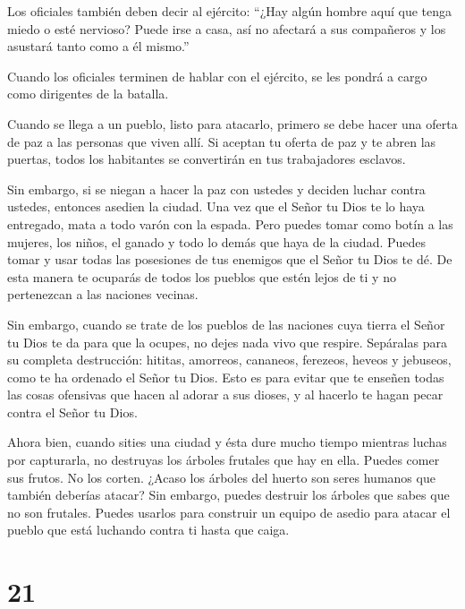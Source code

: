 Los oficiales también deben decir al ejército: ``¿Hay algún
hombre aquí que tenga miedo o esté nervioso? Puede irse a casa, así no
afectará a sus compañeros y los asustará tanto como a él mismo.''

 Cuando los oficiales terminen de hablar con el ejército, se
les pondrá a cargo como dirigentes de la batalla.

 Cuando se llega a un pueblo, listo para atacarlo, primero
se debe hacer una oferta de paz a las personas que viven allí.
 Si aceptan tu oferta de paz y te abren las puertas, todos
los habitantes se convertirán en tus trabajadores esclavos.

 Sin embargo, si se niegan a hacer la paz con ustedes y
deciden luchar contra ustedes, entonces asedien la ciudad. 
Una vez que el Señor tu Dios te lo haya entregado, mata a todo varón con
la espada.  Pero puedes tomar como botín a las mujeres, los
niños, el ganado y todo lo demás que haya de la ciudad. Puedes tomar y
usar todas las posesiones de tus enemigos que el Señor tu Dios te dé.
 De esta manera te ocuparás de todos los pueblos que estén
lejos de ti y no pertenezcan a las naciones vecinas.

 Sin embargo, cuando se trate de los pueblos de las
naciones cuya tierra el Señor tu Dios te da para que la ocupes, no dejes
nada vivo que respire.  Sepáralas para su completa
destrucción: hititas, amorreos, cananeos, ferezeos, heveos y jebuseos,
como te ha ordenado el Señor tu Dios.  Esto es para evitar
que te enseñen todas las cosas ofensivas que hacen al adorar a sus
dioses, y al hacerlo te hagan pecar contra el Señor tu Dios.

 Ahora bien, cuando sities una ciudad y ésta dure mucho
tiempo mientras luchas por capturarla, no destruyas los árboles frutales
que hay en ella. Puedes comer sus frutos. No los corten. ¿Acaso los
árboles del huerto son seres humanos que también deberías atacar?
 Sin embargo, puedes destruir los árboles que sabes que no
son frutales. Puedes usarlos para construir un equipo de asedio para
atacar el pueblo que está luchando contra ti hasta que caiga.

\hypertarget{section-20}{%
\section{21}\label{section-20}}

